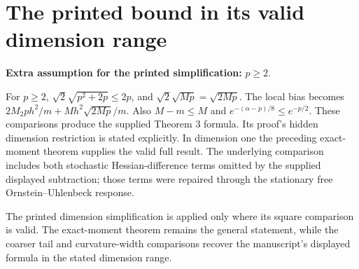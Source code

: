 \documentclass[11pt,a4paper]{article}
\begin{document}
\section{\texorpdfstring{The printed bound in its valid dimension range}{The printed bound in its valid dimension range}}


\textbf{Extra assumption for the printed simplification:} \(p\ge2\).



For \(p\ge2\), \(\sqrt2\sqrt{p^2+2p}\le2p\), and \(\sqrt2\sqrt{Mp}=\sqrt{2Mp}\). The local bias becomes \(2M_2ph^2/m+Mh^2\sqrt{2Mp}/m\). Also \(M-m\le M\) and \(e^{-(\alpha-p)/8}\le e^{-p/2}\). These comparisons produce the supplied Theorem 3 formula. Its proof’s hidden dimension restriction is stated explicitly. In dimension one the preceding exact-moment theorem supplies the valid full result. The underlying comparison includes both stochastic Hessian-difference terms omitted by the supplied displayed subtraction; those terms were repaired through the stationary free Ornstein–Uhlenbeck response.



The printed dimension simplification is applied only where its square comparison is valid. The exact-moment theorem remains the general statement, while the coarser tail and curvature-width comparisons recover the manuscript’s displayed formula in the stated dimension range.
\end{document}

